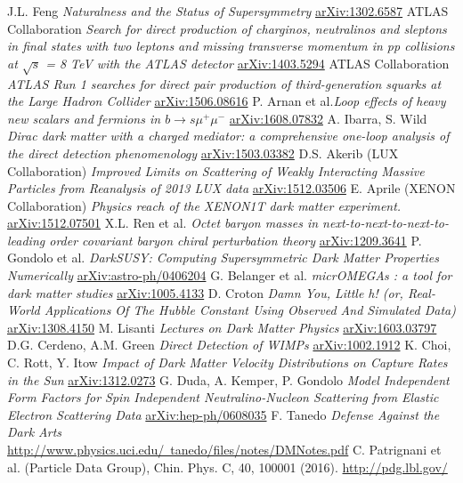 \begin{thebibliography}{xxx}
 J.L. Feng  \textit{Naturalness and the Status of Supersymmetry} \href{https://arxiv.org/abs/1302.6587}{arXiv:1302.6587}
 ATLAS Collaboration \textit{Search for direct production of charginos, neutralinos and sleptons in final states with two leptons and missing transverse momentum in pp collisions at $\sqrt{s}$ = 8 TeV with the ATLAS detector} \href{https://arxiv.org/abs/1403.5294}{arXiv:1403.5294}
 ATLAS Collaboration \textit{ATLAS Run 1 searches for direct pair production of third-generation squarks at the Large Hadron Collider} \href{https://arxiv.org/abs/1506.08616}{arXiv:1506.08616}
 P. Arnan et al.\textit{Loop effects of heavy new scalars and fermions in $b\rightarrow s\mu^+\mu^-$} \href{https://arxiv.org/abs/1608.07832}{arXiv:1608.07832}
 A. Ibarra, S. Wild \textit{Dirac dark matter with a charged mediator: a comprehensive one-loop analysis of the direct detection phenomenology}  \href{https://arxiv.org/abs/1503.03382}{arXiv:1503.03382}
 D.S. Akerib (LUX Collaboration) \textit{Improved Limits on Scattering of Weakly Interacting Massive Particles from Reanalysis of 2013 LUX data} \href{https://arxiv.org/abs/1512.03506}{arXiv:1512.03506}
 E. Aprile (XENON Collaboration) \textit{Physics reach of the XENON1T dark matter experiment.} \href{https://arxiv.org/abs/1512.07501}{arXiv:1512.07501}
 X.L. Ren et al. \textit{Octet baryon masses in next-to-next-to-next-to-leading order covariant baryon chiral perturbation theory} \href{https://arxiv.org/abs/1209.3641}{arXiv:1209.3641}
 P. Gondolo et al. \textit{DarkSUSY: Computing Supersymmetric Dark Matter Properties Numerically} \href{https://arxiv.org/abs/astro-ph/0406204}{arXiv:astro-ph/0406204}
 G. Belanger et al. \textit{micrOMEGAs : a tool for dark matter studies} \href{https://arxiv.org/abs/1005.4133}{arXiv:1005.4133}
 D. Croton \textit{Damn You, Little h! (or, Real-World Applications Of The Hubble Constant Using Observed And Simulated Data)} \href{https://arxiv.org/abs/1308.4150}{arXiv:1308.4150}
 M. Lisanti \textit{Lectures on Dark Matter Physics} \href{https://arxiv.org/abs/1603.03797}{arXiv:1603.03797}
 D.G. Cerdeno, A.M. Green \textit{Direct Detection of WIMPs} \href{https://arxiv.org/abs/1002.1912}{arXiv:1002.1912}
 K. Choi, C. Rott, Y. Itow \textit{Impact of Dark Matter Velocity Distributions on Capture Rates in the Sun} \href{https://arxiv.org/abs/1312.0273}{arXiv:1312.0273}
 G. Duda, A. Kemper, P. Gondolo \textit{Model Independent Form Factors for Spin Independent Neutralino-Nucleon Scattering from Elastic Electron Scattering Data} \href{https://arxiv.org/abs/hep-ph/0608035v2}{arXiv:hep-ph/0608035}
 F. Tanedo \textit{Defense Against the Dark Arts}\\ \href{http://www.physics.uci.edu/~tanedo/files/notes/DMNotes.pdf}{http://www.physics.uci.edu/~tanedo/files/notes/DMNotes.pdf}
 C. Patrignani et al. (Particle Data Group), Chin. Phys. C, 40, 100001 (2016). \href{http://pdg.lbl.gov/}{http://pdg.lbl.gov/}
\end{thebibliography}